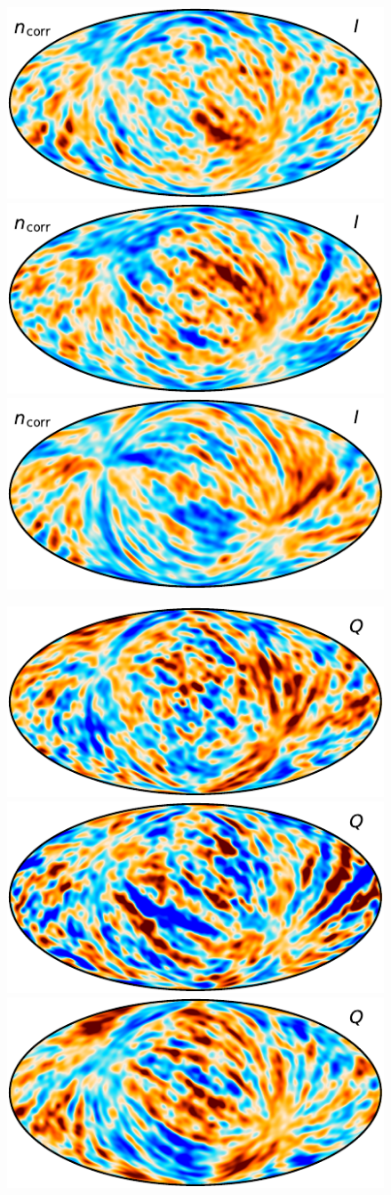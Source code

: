 \documentclass[twocolumn]{aa}
\begin{document}
\begin{figure}
	\begin{center}
		\includegraphics[width=0.33\linewidth]{figs/tod_030_ncorr_c0001_k000060_I_Stokes_w8_n512_300arcmin_c-planck.pdf}
		\includegraphics[width=0.33\linewidth]{figs/tod_044_ncorr_c0001_k000060_I_Stokes_w8_n512_300arcmin_c-planck.pdf}
		\includegraphics[width=0.33\linewidth]{figs/tod_070_ncorr_c0001_k000060_I_Stokes_w8_n1024_300arcmin_c-planck.pdf}
	\end{center}
	\begin{center}
		\includegraphics[width=0.33\linewidth]{figs/tod_030_ncorr_c0001_k000060_Q_Stokes_w8_n512_300arcmin_c-planck.pdf}
		\includegraphics[width=0.33\linewidth]{figs/tod_044_ncorr_c0001_k000060_Q_Stokes_w8_n512_300arcmin_c-planck.pdf}
		\includegraphics[width=0.33\linewidth]{figs/tod_070_ncorr_c0001_k000060_Q_Stokes_w8_n1024_300arcmin_c-planck.pdf}
	\end{center}
	\begin{center}

\end{center}
\end{figure}
\end{document}
